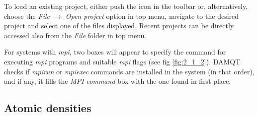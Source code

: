 \documentclass[10pt]{article}
\begin{document}
To load an existing project, either push the \toolbA icon in the toolbar or,
alternatively, choose the {\it File $\rightarrow$ Open project} option in
top menu, navigate to the desired project and select one of the files displayed.
Recent projects can be directly accessed also from the {\it File} folder in
top menu.

For systems with {\it mpi}, two boxes will appear to
specify the command for executing {\it mpi} programs and  
suitable {\it mpi} flags (see fig \ref{fig:2_1_2}). DAMQT checks if {\it mpirun} or 
{\it mpiexec} commands are installed in the system (in that order), and if any, 
it fills the {\it MPI command} box with the one found in first place.



\subsection{Atomic densities \label{sec:2.2}}
\end{document}

